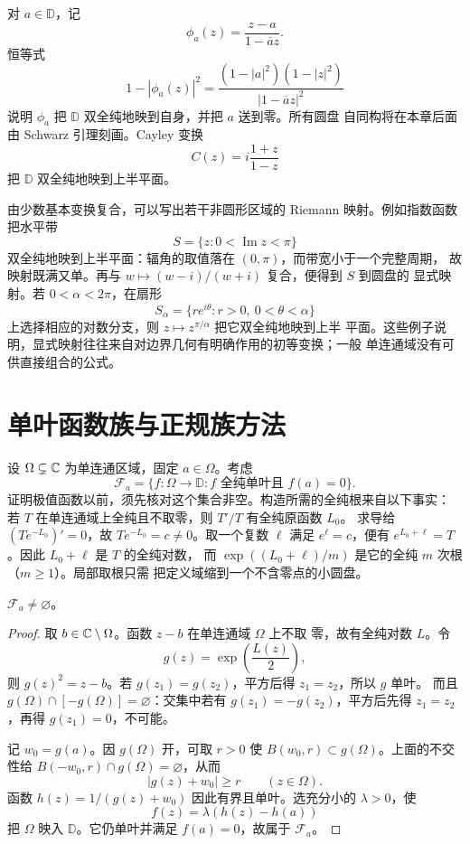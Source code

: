 对 $a\in\mathbb D$，记
\begin{equation}\label{eq:disk-automorphism-basic}
 \phi_a(z)=\frac{z-a}{1-\overline a z}.
\end{equation}
恒等式
\begin{equation}\label{eq:disk-automorphism-identity}
 1-|\phi_a(z)|^2
 =\frac{(1-|a|^2)(1-|z|^2)}{|1-\overline a z|^2}
\end{equation}
说明 $\phi_a$ 把 $\mathbb D$ 双全纯地映到自身，并把 $a$ 送到零。所有圆盘
自同构将在本章后面由 Schwarz 引理刻画。Cayley 变换
\[
 C(z)=i\frac{1+z}{1-z}
\]
把 $\mathbb D$ 双全纯地映到上半平面。

由少数基本变换复合，可以写出若干非圆形区域的 Riemann 映射。例如指数函数
把水平带
\[
 S=\{z:0<\operatorname{Im}z<\pi\}
\]
双全纯地映到上半平面：辐角的取值落在 $(0,\pi)$，而带宽小于一个完整周期，
故映射既满又单。再与 $w\mapsto(w-i)/(w+i)$ 复合，便得到 $S$ 到圆盘的
显式映射。若 $0<\alpha<2\pi$，在扇形
\[
 S_\alpha=\{re^{i\theta}:r>0,\ 0<\theta<\alpha\}
\]
上选择相应的对数分支，则 $z\mapsto z^{\pi/\alpha}$ 把它双全纯地映到上半
平面。这些例子说明，显式映射往往来自对边界几何有明确作用的初等变换；一般
单连通域没有可供直接组合的公式。

\section{单叶函数族与正规族方法}

设 $\Omega\subsetneq\mathbb{C}$ 为单连通区域，固定 $a\in\Omega$。考虑
\[
 \mathcal F_a=\{f:\Omega\to\mathbb D:
 f\text{ 全纯单叶且 }f(a)=0\}.
\]
证明极值函数以前，须先核对这个集合非空。构造所需的全纯根来自以下事实：
若 $T$ 在单连通域上全纯且不取零，则 $T'/T$ 有全纯原函数 $L_0$。
求导给 $(Te^{-L_0})'=0$，故 $Te^{-L_0}=c\ne0$。取一个复数 $\ell$ 满足
$e^\ell=c$，便有 $e^{L_0+\ell}=T$。因此 $L_0+\ell$ 是 $T$ 的全纯对数，
而 $\exp((L_0+\ell)/m)$ 是它的全纯 $m$ 次根（$m\ge1$）。局部取根只需
把定义域缩到一个不含零点的小圆盘。

\begin{lemma}\label{lem:riemann-family-nonempty}
$\mathcal F_a\ne\varnothing$。
\end{lemma}

\begin{proof}
取 $b\in\mathbb{C}\setminus\Omega$。函数 $z-b$ 在单连通域 $\Omega$ 上不取
零，故有全纯对数 $L$。令
\[
 g(z)=\exp\!\left(\frac{L(z)}2\right),
\]
则 $g(z)^2=z-b$。若 $g(z_1)=g(z_2)$，平方后得 $z_1=z_2$，所以 $g$ 单叶。
而且 $g(\Omega)\cap[-g(\Omega)]=\varnothing$：交集中若有
$g(z_1)=-g(z_2)$，平方后先得 $z_1=z_2$，再得 $g(z_1)=0$，不可能。

记 $w_0=g(a)$。因 $g(\Omega)$ 开，可取 $r>0$ 使
$B(w_0,r)\subset g(\Omega)$。上面的不交性给
$B(-w_0,r)\cap g(\Omega)=\varnothing$，从而
\[
 |g(z)+w_0|\ge r\qquad(z\in\Omega).
\]
函数 $h(z)=1/(g(z)+w_0)$ 因此有界且单叶。选充分小的 $\lambda>0$，使
\[
 f(z)=\lambda(h(z)-h(a))
\]
把 $\Omega$ 映入 $\mathbb D$。它仍单叶并满足 $f(a)=0$，故属于
$\mathcal F_a$。
\end{proof}

